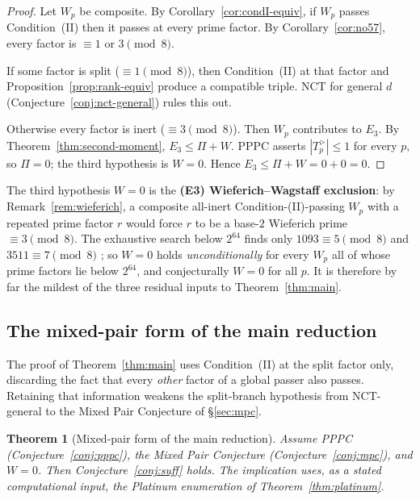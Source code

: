 \documentclass[11pt]{amsart}
\theoremstyle{plain}
\newtheorem{theorem}{Theorem}[section]
\theoremstyle{definition}
\theoremstyle{remark}
\numberwithin{equation}{section}
\begin{document}
\begin{proof}
Let $W_p$ be composite. By Corollary~\ref{cor:condI-equiv}, if $W_p$ passes Condition~(II) then it passes at every prime factor. By Corollary~\ref{cor:no57}, every factor is $\equiv 1$ or $3 \pmod 8$.

If some factor is split ($\equiv 1 \pmod 8$), then Condition~(II) at that factor and Proposition~\ref{prop:rank-equiv} produce a compatible triple. NCT for general $d$ (Conjecture~\ref{conj:nct-general}) rules this out.

Otherwise every factor is inert ($\equiv 3 \pmod 8$). Then $W_p$ contributes to $E_3$. By Theorem~\ref{thm:second-moment}, $E_3 \leq \Pi + W$. PPPC asserts $|T_p^{>}| \leq 1$ for every $p$, so $\Pi = 0$; the third hypothesis is $W = 0$. Hence $E_3 \leq \Pi + W = 0 + 0 = 0$.
\end{proof}

The third hypothesis $W = 0$ is the \textbf{(E3) Wieferich--Wagstaff exclusion}: by Remark~\ref{rem:wieferich}, a composite all-inert Condition-(II)-passing $W_p$ with a repeated prime factor $r$ would force $r$ to be a base-$2$ Wieferich prime $\equiv 3 \pmod 8$. The exhaustive search below $2^{64}$ finds only $1093\equiv5\pmod8$ and $3511\equiv7\pmod8$ \cite{ref:OEISWieferich}; so $W = 0$ holds \emph{unconditionally} for every $W_p$ all of whose prime factors lie below $2^{64}$, and conjecturally $W = 0$ for all $p$. It is therefore by far the mildest of the three residual inputs to Theorem~\ref{thm:main}.

\subsection{The mixed-pair form of the main reduction}\label{sec:main-mpc}

The proof of Theorem~\ref{thm:main} uses Condition~(II) at the split factor only, discarding the fact that every \emph{other} factor of a global passer also passes. Retaining that information weakens the split-branch hypothesis from NCT-general to the Mixed Pair Conjecture of \S\ref{sec:mpc}.

\begin{theorem}[Mixed-pair form of the main reduction]\label{thm:main-mpc}
Assume PPPC (Conjecture~\ref{conj:pppc}), the Mixed Pair Conjecture (Conjecture~\ref{conj:mpc}), and $W = 0$. Then Conjecture~\ref{conj:suff} holds. The implication uses, as a stated computational input, the Platinum enumeration of Theorem~\ref{thm:platinum}.
\end{theorem}
\end{document}
